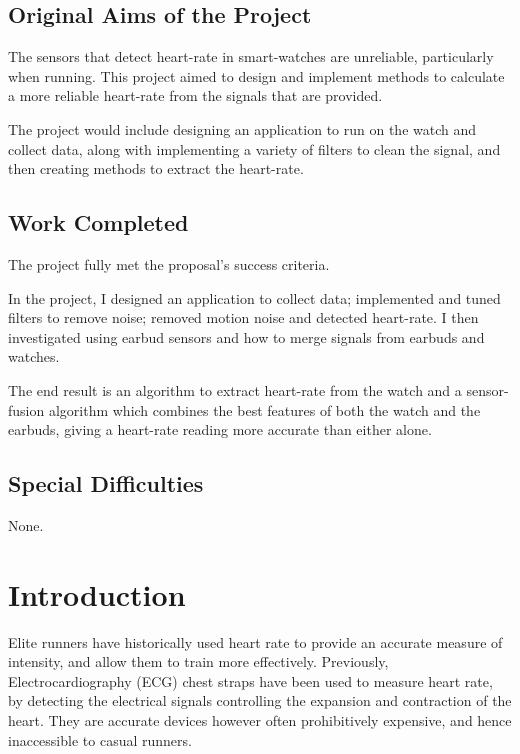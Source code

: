 \documentclass[12pt,a4paper,twoside,openany]{report}
\begin{document}
\section*{Original Aims of the Project}

The sensors that detect heart-rate in smart-watches are unreliable,
particularly when running. This project aimed to design and implement methods
to calculate a more reliable heart-rate from the signals that are provided.

The project would include designing an application to run on the watch and
collect data, along with implementing a variety of filters to clean the
signal, and then creating methods to extract the heart-rate.

\section*{Work Completed}

The project fully met the proposal’s success criteria.

In the project, I designed an application to collect data; implemented and
tuned filters to remove noise; removed motion noise and detected heart-rate. I
then investigated using earbud sensors and how to merge signals from earbuds
and watches.

The end result is an algorithm to extract heart-rate from the watch and a
sensor-fusion algorithm which combines the best features of both the watch and
the earbuds, giving a heart-rate reading more accurate than either alone.

\section*{Special Difficulties}

None.
 

\tableofcontents

\listoffigures

\newpage



\pagestyle{headings}

\chapter{Introduction}

Elite runners have historically used heart rate to provide an accurate 
measure of intensity, and allow them to train more effectively. 
Previously, Electrocardiography (ECG) chest straps have been 
used to measure heart rate, by detecting the electrical signals controlling 
the expansion and contraction of the heart. They are accurate devices however
often prohibitively expensive, and hence inaccessible to casual runners.
\end{document}

